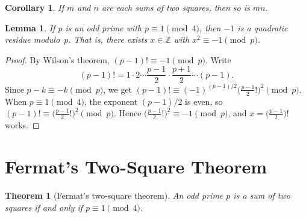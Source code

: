 \documentclass[12pt,a4paper,openany]{book}
\theoremstyle{definition}
\theoremstyle{plain}
\newtheorem{theorem}[definition]{Theorem}
\newtheorem{lemma}[definition]{Lemma}
\newtheorem{corollary}[definition]{Corollary}
\theoremstyle{remark}
\newcommand{\Z}{\mathbb{Z}}
\begin{document}
\begin{corollary}\label{cor:product-two-sq}
If $m$ and $n$ are each sums of two squares, then so is $mn$.
\end{corollary}

\begin{lemma}\label{lem:minus-one-qr}
If $p$ is an odd prime with $p \equiv 1 \pmod{4}$, then $-1$ is a quadratic
residue modulo~$p$.  That is, there exists $x \in \Z$ with $x^2 \equiv -1 \pmod{p}$.
\end{lemma}

\begin{proof}
By Wilson's theorem,
$(p-1)! \equiv -1 \pmod{p}$.  Write
\[
  (p-1)! = 1 \cdot 2 \cdots \frac{p-1}{2} \cdot \frac{p+1}{2} \cdots (p-1).
\]
Since $p-k \equiv -k \pmod{p}$, we get
$(p-1)! \equiv (-1)^{(p-1)/2}\bigl(\tfrac{p-1}{2}!\bigr)^2 \pmod{p}$.
When $p \equiv 1 \pmod{4}$, the exponent $(p-1)/2$ is even, so
$(p-1)! \equiv \bigl(\tfrac{p-1}{2}!\bigr)^2 \pmod{p}$.
Hence $\bigl(\tfrac{p-1}{2}!\bigr)^2 \equiv -1 \pmod{p}$, and
$x = \bigl(\tfrac{p-1}{2}\bigr)!$ works.
\end{proof}

\section{Fermat's Two-Square Theorem}\label{sec:fermat-two-sq}

\begin{theorem}[Fermat's two-square theorem]\label{thm:fermat-two-sq}
An odd prime $p$ is a sum of two squares if and only if $p \equiv 1 \pmod{4}$.
\end{theorem}
\end{document}
